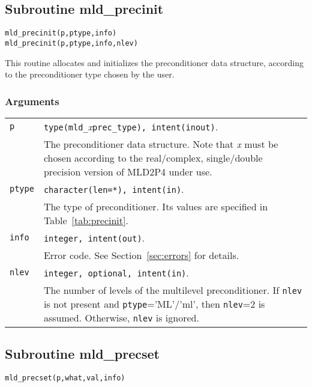 \subsection{Subroutine mld\_precinit\label{sec:precinit}}

\begin{center}
\verb|mld_precinit(p,ptype,info)| \\
\verb|mld_precinit(p,ptype,info,nlev)| \\
\end{center}

\noindent
This routine allocates and initializes the preconditioner data structure,
according to the preconditioner type chosen by the user.

\subsubsection*{Arguments}

\begin{tabular}{p{1.2cm}p{11.5cm}}
\verb|p|      & \verb|type(mld_|\emph{x}\verb|prec_type), intent(inout)|.\\
              & The preconditioner data structure. Note that \emph{x}
                must be chosen according to the real/complex, single/double
                precision version of MLD2P4 under use.\\
\verb|ptype|  & \verb|character(len=*), intent(in)|.\\
              & The type of preconditioner. Its values are specified in Table~\ref{tab:precinit}.\\
\verb|info|   & \verb|integer, intent(out)|.\\
              & Error code. See Section~\ref{sec:errors} for details.\\
\verb|nlev|   & \verb|integer, optional, intent(in)|.\\
              & The number of levels of the multilevel preconditioner.
                If \verb|nlev| is not present and \verb|ptype|='ML'/'ml', 
                then \verb|nlev|=2 is assumed. Otherwise, \verb|nlev| is ignored.
\end{tabular}


\subsection{Subroutine mld\_precset\label{sec:precset}}

\begin{center}
\verb|mld_precset(p,what,val,info)|\\
\end{center}

